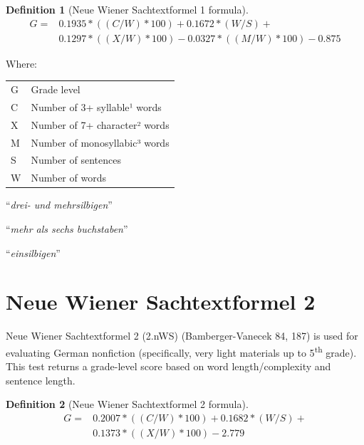 \documentclass[
]{book}
\theoremstyle{definition}
\newtheorem{definition}{Definition}[chapter]
\theoremstyle{definition}
\theoremstyle{definition}
\theoremstyle{definition}
\theoremstyle{remark}
\begin{document}
\begin{definition}[Neue Wiener Sachtextformel 1 formula]
\protect\hypertarget{def:nws1}{}{\label{def:nws1} {} }\begin{align*}
  G = & 0.1935*((C/W)*100) + 0.1672*(W/S) + \\
      & 0.1297*((X/W)*100) - 0.0327*((M/W)*100) - 0.875
\end{align*}
\end{definition}

Where:

\begin{table}
\centering
\begin{threeparttable}
\begin{tabular}[t]{ll}
\toprule
G & Grade level\\
C & Number of 3+ syllable¹ words\\
X & Number of 7+ character² words\\
M & Number of monosyllabic³ words\\
S & Number of sentences\\
W & Number of words\\
\bottomrule
\end{tabular}
\begin{tablenotes}
\item[1] “\textit{drei- und mehrsilbigen}”
\item[2] “\textit{mehr als sechs buchstaben}”
\item[3] “\textit{einsilbigen}”
\end{tablenotes}
\end{threeparttable}
\end{table}

\newpage

\hypertarget{neue-wiener-sachtextformel2}{%
\section{\texorpdfstring{Neue Wiener Sachtextformel 2}{Neue Wiener Sachtextformel 2}}\label{neue-wiener-sachtextformel2}}

Neue Wiener Sachtextformel 2 (2.nWS) (Bamberger-Vanecek 84, 187) is used for evaluating German nonfiction (specifically, very light materials up to 5\textsuperscript{th} grade). This test returns a grade-level score based on word length/complexity and sentence length.

\begin{definition}[Neue Wiener Sachtextformel 2 formula]
\protect\hypertarget{def:nws2}{}{\label{def:nws2} {} }\begin{align*}
  G = & 0.2007*((C/W)*100) + 0.1682*(W/S) + \\
      & 0.1373*((X/W)*100) - 2.779
\end{align*}
\end{definition}
\end{document}
